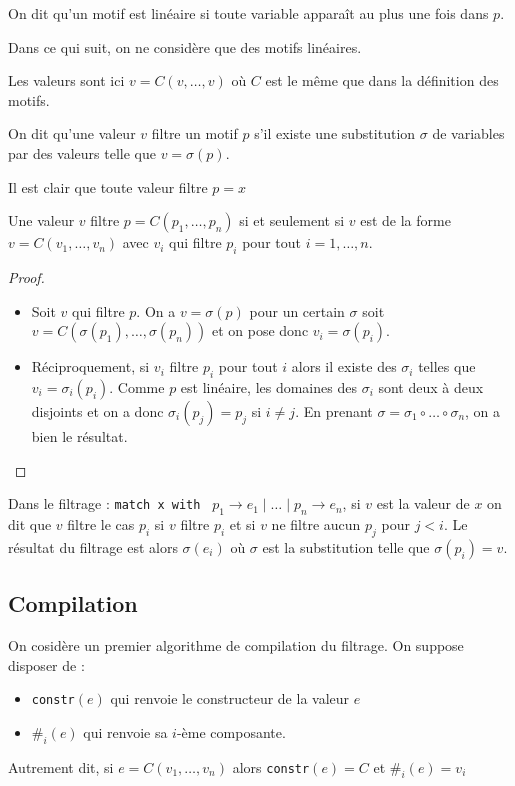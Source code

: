 \documentclass{cours}
\begin{document}
\begin{definition}
    On dit qu'un motif est linéaire si toute variable apparaît au plus une fois dans $p$.
\end{definition}

Dans ce qui suit, on ne considère que des motifs linéaires.
\begin{definition}
    Les valeurs sont ici $v = C(v, \ldots, v)$ où $C$ est le même que dans la définition des motifs.
\end{definition}
\begin{definition}
    On dit qu'une valeur $v$ filtre un motif $p$ s'il existe une substitution $\sigma$ de variables par des valeurs telle que $v = \sigma(p)$.
\end{definition}

Il est clair que toute valeur filtre $p = x$
\begin{proposition}
    Une valeur $v$ filtre $p = C(p_{1}, \ldots, p_{n})$ si et seulement si $v$ est de la forme $v = C(v_{1},\ldots, v_{n})$ avec $v_{i}$ qui filtre $p_{i}$ pour tout $i = 1, \ldots, n$.
\end{proposition}
\begin{proof}
    \begin{itemize}
        \item Soit $v$ qui filtre $p$. On a $v = \sigma(p)$ pour un certain $\sigma$ soit $v = C(\sigma(p_{1}),\ldots, \sigma(p_{n}))$ et on pose donc $v_{i} = \sigma(p_{i})$.
        \item Réciproquement, si $v_{i}$ filtre $p_{i}$ pour tout $i$ alors il existe des $\sigma_{i}$ telles que $v_{i} = \sigma_{i}(p_{i})$. Comme $p$ est linéaire, les domaines des $\sigma_{i}$ sont deux à deux disjoints et on a donc $\sigma_{i}(p_{j}) = p_{j}$ si $i \neq j$. En prenant $\sigma = \sigma_{1} \circ \ldots \circ \sigma_{n}$, on a bien le résultat.
    \end{itemize}
\end{proof}
\begin{definition}
    Dans le filtrage : \texttt{match x with } $p_{1} \rightarrow e_{1} \mid \ldots \mid p_{n} \rightarrow e_{n}$, si $v$ est la valeur de $x$ on dit que $v$ filtre le cas $p_{i}$ si $v$ filtre $p_{i}$ et si $v$ ne filtre aucun $p_{j}$ pour $j < i$. Le résultat du filtrage est alors $\sigma(e_{i})$ où $\sigma$ est la substitution telle que $\sigma(p_{i}) = v$.
\end{definition}

\subsection{Compilation}
On cosidère un premier algorithme de compilation du filtrage. On suppose disposer de :
\begin{itemize}
    \item \texttt{constr}$(e)$ qui renvoie le constructeur de la valeur $e$
    \item $\texttt{\#}_{i}(e)$ qui renvoie sa $i$-ème composante.
\end{itemize}
Autrement dit, si $e = C(v_{1}, \ldots, v_{n})$ alors \texttt{constr}$(e) = C$ et $\texttt{\#}_{i}(e) = v_{i}$
\end{document}
